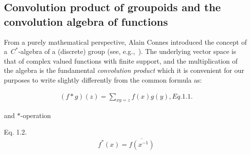 \documentclass[12pt]{article}
\theoremstyle{plain}
\theoremstyle{definition}
\numberwithin{equation}{section}
\begin{document}
\subsection{Convolution product of groupoids and the convolution algebra of functions}

From a purely mathematical perspective, Alain Connes introduced the concept of   a~$C^{\ast}$-algebra of a (discrete) group (see, e.g.,~\cite{Connes94}). The underlying vector space is that of complex valued functions
with finite support, and the multiplication of the algebra is the fundamental \emph{convolution product} which it is convenient for our
purposes to write slightly differently from the common formula as:
 

\begin{gather*} 
(f \ast g )(z) = \sum_{xy=z} f(x)g(y),  Eq. 1.1. 
\end{gather*}

and $\ast$-operation

Eq. 1.2. 
\begin{gather*}
f^{\ast}(x)= \overline{f(x^{-1})}
\end{gather*}
\end{document}
